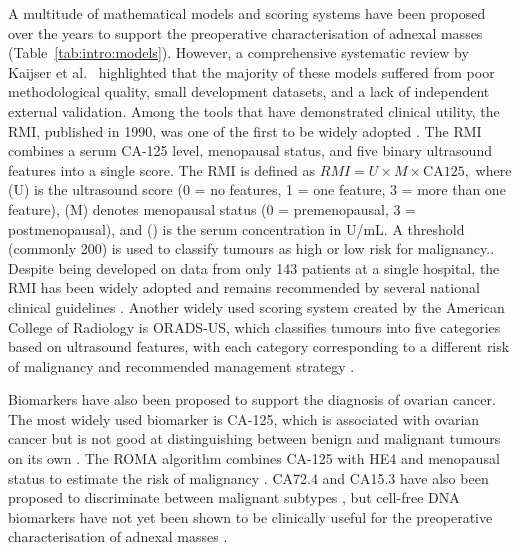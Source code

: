 A multitude of mathematical models and scoring systems have been proposed over the years to support the preoperative characterisation of adnexal masses (Table~\ref{tab:intro:models}). However, a comprehensive systematic review by Kaijser et al.\ \cite{kaijserPresurgicalDiagnosisAdnexal2014} highlighted that the majority of these models suffered from poor methodological quality, small development datasets, and a lack of independent external validation. Among the tools that have demonstrated clinical utility, the \gls{RMI}, published in 1990, was one of the first to be widely adopted \cite{jacobsRiskMalignancyIndex1990}. The \gls{RMI} combines a serum CA-125 level, menopausal status, and five binary ultrasound features into a single score. The RMI is defined as
 $RMI = U \times M \times \mathrm{CA125},$
where (U) is the ultrasound score (0 = no features, 1 = one feature, 3 = more than one feature), (M) denotes menopausal status (0 = premenopausal, 3 = postmenopausal), and () is the serum concentration in U/mL. A threshold (commonly 200) is used to classify tumours as high or low risk for malignancy.. Despite being developed on data from only 143 patients at a single hospital, the \gls{RMI} has been widely adopted and remains recommended by several national clinical guidelines \cite{timmermanESGOISUOGIOTA2021}. Another widely used scoring system created by the American College of Radiology is \gls{ORADS}-US, which classifies tumours into five categories based on ultrasound features, with each category corresponding to a different risk of malignancy and recommended management strategy \cite{andreottiORADSUSRisk2020}. 

Biomarkers have also been proposed to support the diagnosis of ovarian cancer. The most widely used biomarker is CA-125, which is associated with ovarian cancer but is not good at distinguishing between benign and malignant tumours on its own \cite{mossRoleCA125Clinical2005}. The ROMA algorithm combines CA-125 with HE4 and menopausal status to estimate the risk of malignancy \cite{mooreUseMultipleNovel2008}. CA72.4 and CA15.3 have also been proposed to discriminate between malignant subtypes \cite{coosemansAddedValueSerum2025}, but cell-free DNA biomarkers have not yet been shown to be clinically useful for the preoperative characterisation of adnexal masses \cite{vandersticheleAddedValueCellfree2025}. 

